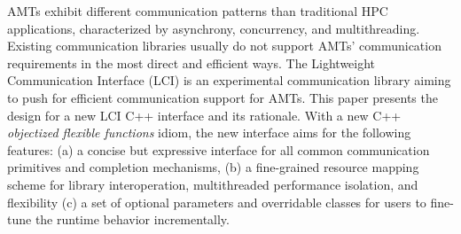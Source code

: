 AMTs exhibit different communication patterns than traditional HPC applications, characterized by asynchrony, concurrency, and multithreading. Existing communication libraries usually do not support AMTs' communication requirements in the most direct and efficient ways. The Lightweight Communication Interface (LCI) is an experimental communication library aiming to push for efficient communication support for AMTs. This paper presents the design for a new LCI C++ interface and its rationale. With a new C++ \emph{objectized flexible functions} idiom, the new interface aims for the following features: (a) a concise but expressive interface for all common communication primitives and completion mechanisms, (b) a fine-grained resource mapping scheme for library interoperation, multithreaded performance isolation, and flexibility (c) a set of optional parameters and overridable classes for users to fine-tune the runtime behavior incrementally.
